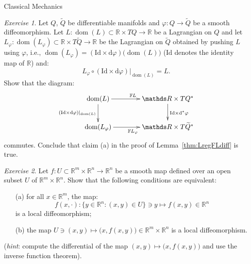 \documentclass[oneside,a4paper,11pt]{amsbook}
\newcommand{\R}{\mathds R}
\newcommand{\dd}{\mathrm d}
\newcommand{\Id}{\mathrm{Id}}
\DeclareMathOperator{\Dom}{dom}
\theoremstyle{remark}\newtheorem{exercise}{Exercise}[chapter]
\theoremstyle{plain}\newtheorem{teo}{Theorem}[section]
\theoremstyle{plain}\newtheorem{lem}[teo]{Lemma}
\theoremstyle{plain}\newtheorem{prop}[teo]{Proposition}
\theoremstyle{plain}\newtheorem{cor}[teo]{Corollary}
\theoremstyle{definition}\newtheorem{defin}[teo]{Definition}
\theoremstyle{remark}\newtheorem{rem}[teo]{Remark}
\theoremstyle{definition}\newtheorem{notation}[teo]{Notation}
\theoremstyle{definition}\newtheorem{convention}[teo]{Convention}
\theoremstyle{definition}\newtheorem{example}[teo]{Example}
\numberwithin{section}{chapter}
\numberwithin{equation}{section}
\begin{document}
\begin{chapter}{Classical Mechanics}
\begin{exercise}\label{exe:lemregdiff}
Let $Q$, $\widetilde Q$ be differentiable manifolds and $\varphi:Q\to\widetilde Q$ be a smooth diffeomorphism. Let $L:\Dom(L)\subset\R\times TQ\to\R$ be a
Lagrangian on $Q$ and let $L_\varphi:\Dom(L_\varphi)\subset\R\times T\widetilde Q\to\R$ be the Lagrangian on $\widetilde Q$ obtained by pushing $L$
using $\varphi$, i.e., $\Dom(L_\varphi)=(\Id\times\dd\varphi)\big(\!\Dom(L)\big)$ ($\Id$ denotes the identity map of $\R$) and:
\[L_\varphi\circ(\Id\times\dd\varphi)\vert_{\Dom(L)}=L.\]
Show that the diagram:
\[\xymatrix@C+15pt{%
\Dom(L)\ar[r]^{\mathbb FL}\ar[d]_{(\Id\times\dd\varphi)\vert_{\Dom(L)}}&\R\times TQ^*\ar[d]^{\Id\times\dd^*\varphi}\\
\Dom(L_\varphi)\ar[r]_{\mathbb FL_\varphi}&\R\times T\widetilde Q^*}\]
commutes. Conclude that claim (a) in the proof of Lemma~\ref{thm:LregFLdiff} is true.
\end{exercise}

\begin{exercise}\label{exe:invfuncteo}
Let $f:U\subset\R^m\times\R^n\to\R^n$ be a smooth map defined over an open subset $U$ of $\R^m\times\R^n$. Show that the following conditions are equivalent:
\begin{itemize}
\item[(a)] for all $x\in\R^m$, the map:
\[f(x,\cdot):\big\{y\in\R^n:(x,y)\in U\big\}\ni y\longmapsto f(x,y)\in\R^n\]
is a local diffeomorphism;
\item[(b)] the map $U\ni(x,y)\mapsto\big(x,f(x,y)\big)\in\R^m\times\R^n$ is a local diffeomorphism.
\end{itemize}
({\em hint}: compute the differential of the map $(x,y)\mapsto\big(x,f(x,y)\big)$ and use the inverse function theorem).
\end{exercise}


\end{chapter}
\end{document}
